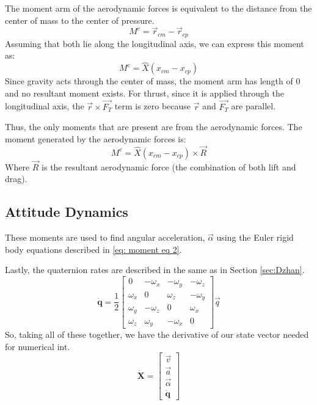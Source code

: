 \documentclass[12pt]{report}
\begin{document}
The moment arm of the aerodynamic forces is equivalent to the distance from the center of mass to the center of pressure. 
\begin{equation}
    M^c=\vec{r}_{cm}-\vec{r}_{cp}
\end{equation}
Assuming that both lie along the longitudinal axis, we can express this moment as:
\begin{equation}
    M^c=\hat{X}(x_{cm}-x_{cp})
\end{equation}
Since gravity acts through the center of mass, the moment arm has length of 0 and no resultant moment exists. For thrust, since it is applied through the longitudinal axis, the $\vec{r}\times \vec{F_T}$ term is zero because $\vec{r}$ and $\vec{F_T}$ are parallel.

Thus, the only moments that are present are from the aerodynamic forces. The moment generated by the aerodynamic forces is:
\begin{equation}
    M^c=\hat{X}(x_{cm}-x_{cp})\times \vec{R}
\end{equation}
Where $\vec{R}$ is the resultant aerodynamic force (the combination of both lift and drag).

\subsection{Attitude Dynamics}
These moments are used to find angular acceleration, $\vec{\alpha}$ using the Euler \gls{rigid body} equations described in \eqref{eq: moment eq 2}. 

Lastly, the \gls{quaternion} rates are described in the same as in Section \ref{sec:Dzhan}.
\begin{equation}
    \dot{\textbf{q}}=\frac{1}{2}\begin{bmatrix}
        0&-\omega_x&-\omega_y&-\omega_z\\
        \omega_x&0&\omega_z&-\omega_y\\
        \omega_y&-\omega_z&0&\omega_x\\
        \omega_z&\omega_y&-\omega_x&0
    \end{bmatrix}\vec{q}
\end{equation}
So, taking all of these together, we have the derivative of our \gls{state vector} needed for \gls{numerical int}.
\begin{equation}
    \dot{\textbf{X}}=\begin{bmatrix}
        \vec{v}\\\vec{a}\\\vec{\alpha}\\\dot{\textbf{q}}
    \end{bmatrix}
\end{equation}
\end{document}
